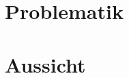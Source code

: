 \documentclass[a4paper, 12pt]{article} %
\begin{document}
\begin{spacing}{1.8}  %
\fontsize{14pt}{15pt}\selectfont  %


\end{spacing}

\clearpage

\section{Problematik}


\begin{spacing}{1.8}  %
\fontsize{14pt}{15pt}\selectfont  %


\end{spacing}

\clearpage

\section{Aussicht}


\begin{spacing}{1.8}  %
\fontsize{14pt}{15pt}\selectfont  %


\end{spacing}

\clearpage
\begingroup
\renewcommand{\bibfont}{\fontsize{13pt}{12pt}\selectfont}  
\sloppy
\printbibliography
\endgroup
\end{document}
